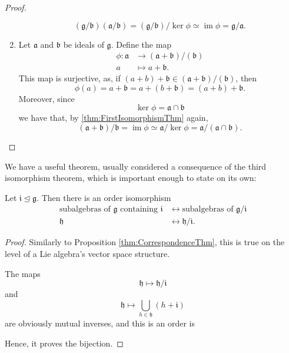 \documentclass{article}
\DeclareMathOperator{\im}{im}
\newcommand*\frka{{\ensuremath{\mathfrak{a}}}}
\newcommand*\frkb{{\ensuremath{\mathfrak{b}}}}
\newcommand*\frkg{{\ensuremath{\mathfrak{g}}}}
\newcommand*\frkh{{\ensuremath{\mathfrak{h}}}}
\newcommand*\frki{{\ensuremath{\mathfrak{i}}}}
\begin{document}
\begin{proof}
\begin{enumerate}[label=(\alph*)]
            \[
                (\frkg/\frkb)(\frka/\frkb)
                =
                (\frkg/\frkb)/\ker\phi
                \simeq
                \im\phi
                =
                \frkg/\frka.
            \]
        \item 
            Let $\frka$ and $\frkb$ be ideals of $\frkg$.
            Define the map
            \begin{align*}
                \phi:
                \frka 
                &\to 
                (\frka+\frkb)/(\frkb)
                \\
                a
                &\mapsto
                a + \frkb.
            \end{align*}
            This map is surjective, as, if $(a + b) + \frkb \in (\frka+\frkb)/(\frkb)$, then
            \[
                \phi(a)
                =
                a + \frkb
                =
                a + (b + \frkb)
                =
                (a + b) + \frkb.
            \]
            Moreover, since
            \[
                \ker \phi
                =
                \frka \cap \frkb
            \]
            we have that, by \ref{thm:FirstIsomorphismThm} again,
            \[
                (\frka+\frkb)/\frkb
                =
                \im \phi
                \simeq
                \frka/\ker\phi
                =
                \frka/(\frka \cap \frkb).
            \]
    \end{enumerate}
\end{proof}

We have a useful theorem, usually considered a consequence of the third isomorphism theorem, which is important enough to state on its own:

\begin{theorem}
    \label{thm:CorrespondenceThm}
    Let $\frki \trianglelefteq \frkg$.
    Then there is an order isomorphism  
    \begin{align*}
        \text{subalgebras of $\frkg$ containing $\frki$}
        &\leftrightarrow
        \text{subalgebras of $\frkg/\frki$}
        \\
        \frkh
        &\leftrightarrow
        \frkh/\frki.
    \end{align*}
\end{theorem}

\begin{proof}
    Similarly to Proposition \ref{thm:CorrespondenceThm}, this is true on the level of a Lie algebra's vector space structure.

    The maps
    \[
        \frkh \mapsto \frkh/\frki
    \]
    and
    \[
        \frkh \mapsto \bigcup_{h \in \frkh} (h + \frki)
    \]
    are obviously mutual inverses, and this is an order is

    Hence, it proves the bijection.
\end{proof}
\end{document}
